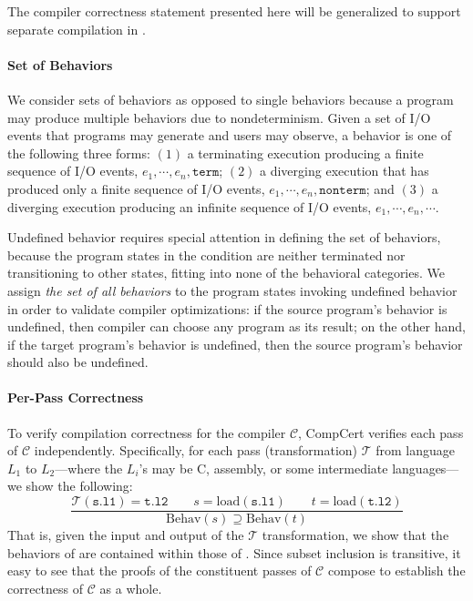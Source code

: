 The compiler correctness statement presented here will be generalized to support separate
compilation in .


\paragraph{Set of Behaviors}

We consider sets of behaviors as opposed to single behaviors because a program may produce multiple
behaviors due to nondeterminism.  Given a set of I/O events that programs may generate and users may
observe, a behavior is one of the following three forms: $(1)$ a terminating execution producing a
finite sequence of I/O events, $e_1, \cdots, e_n, \mathtt{term}$; $(2)$ a diverging execution that
has produced only a finite sequence of I/O events, $e_1, \cdots, e_n, \mathtt{nonterm}$; and $(3)$ a
diverging execution producing an infinite sequence of I/O events, $e_1, \cdots, e_n, \cdots$.

Undefined behavior requires special attention in defining the set of behaviors, because the program
states in the condition are neither terminated nor transitioning to other states, fitting into none
of the behavioral categories.  We assign \emph{the set of all behaviors} to the program states
invoking undefined behavior in order to validate compiler optimizations: if the source program's
behavior is undefined, then compiler can choose any program as its result; on the other hand, if the
target program's behavior is undefined, then the source program's behavior should also be undefined.


\paragraph{Per-Pass Correctness}

To verify compilation correctness for the compiler $\mathcal{C}$, CompCert verifies each pass of
$\mathcal{C}$ independently.  Specifically, for each pass (transformation) $\mathcal{T}$ from
language $L_1$ to $L_2$---where the $L_i$'s may be C, assembly, or some intermediate languages---we
show the following:
\[
\frac{
\mathcal{T}(\mathtt{s.l1}) = \mathtt{t.l2} \qquad
s = \mathrm{load}(\mathtt{s.l1}) \qquad
t = \mathrm{load}(\mathtt{t.l2})
}
{
\mathrm{Behav}(s) \supseteq \mathrm{Behav}(t)
}
\]
That is, given the input  and output  of the $\mathcal{T}$ transformation, we
show that the behaviors of  are contained within those of .  Since subset
inclusion is transitive, it easy to see that the proofs of the constituent passes of $\mathcal{C}$
compose to establish the correctness of $\mathcal{C}$ as a whole.

